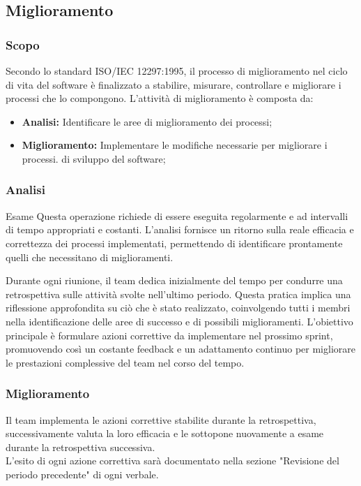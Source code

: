 \subsection{Miglioramento}
\subsubsection{Scopo}
Secondo lo standard ISO/IEC 12297:1995, il processo di miglioramento nel ciclo di vita del software è finalizzato a stabilire, misurare, controllare e migliorare i processi che lo compongono.
L'attività di miglioramento è composta da:
 \begin{itemize}
    \item \textbf{Analisi:} Identificare le aree di miglioramento dei processi;
    \item  \textbf{Miglioramento:} Implementare le modifiche necessarie per migliorare i processi.
    di sviluppo del software;
 \end{itemize}
 \subsubsection{Analisi}
 Esame
Questa operazione richiede di essere eseguita regolarmente e ad intervalli di tempo appropriati e costanti. L'analisi fornisce un ritorno sulla reale efficacia e correttezza dei processi implementati, permettendo di identificare prontamente quelli che necessitano di miglioramenti.

\vspace*{0.1cm}

Durante ogni riunione, il team dedica inizialmente del tempo per condurre una retrospettiva sulle attività svolte nell'ultimo periodo. Questa pratica implica una riflessione approfondita su ciò che è stato realizzato, coinvolgendo tutti i membri nella identificazione delle aree di successo e di possibili miglioramenti. L'obiettivo principale è formulare azioni correttive da implementare nel prossimo sprint, promuovendo così un costante feedback e un adattamento continuo per migliorare le prestazioni complessive del team nel corso del tempo.
 \subsubsection{Miglioramento}
 Il team implementa le azioni correttive stabilite durante la retrospettiva, successivamente valuta la loro efficacia e le sottopone nuovamente a esame durante la retrospettiva successiva.\\
L'esito di ogni azione correttiva sarà documentato nella sezione "Revisione del periodo precedente" di ogni verbale.
